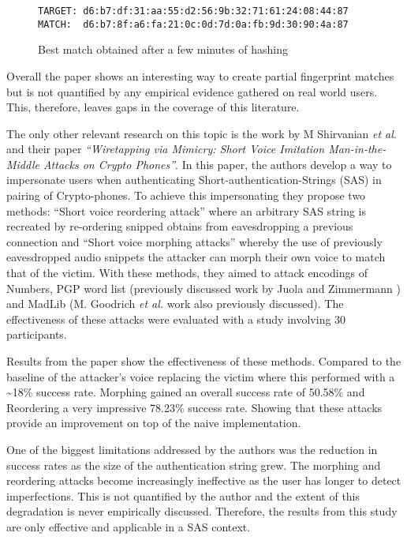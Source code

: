 \begin{figure}[!h]
    \begin{center}
        \verb|TARGET: d6:b7:df:31:aa:55:d2:56:9b:32:71:61:24:08:44:87|
        \verb|MATCH:  d6:b7:8f:a6:fa:21:0c:0d:7d:0a:fb:9d:30:90:4a:87|
    \end{center}
    \caption{Best match obtained after a few minutes of hashing}
    \label{ref:fuzz}
\end{figure}

Overall the paper shows an interesting way to create partial fingerprint matches but is not quantified by any empirical evidence gathered on real world users. This, therefore, leaves gaps in the coverage of this literature.

The only other relevant research on this topic is the work by M 
Shirvanian \textit{et al.}\cite{shirvanian2014wiretapping} 
and their paper \textit{``Wiretapping via Mimicry: Short 
Voice Imitation Man-in-the-Middle Attacks on Crypto 
Phones''}. In this paper, the authors develop a way to 
impersonate users when authenticating 
Short-authentication-Strings (SAS) in pairing of 
Crypto-phones. To achieve this impersonating they propose 
two methods: ``Short voice reordering attack'' where an 
arbitrary SAS string is recreated by re-ordering snipped 
obtains from eavesdropping a previous connection
and ``Short voice morphing attacks'' whereby the use of 
previously eavesdropped audio snippets the attacker can
morph their own voice to match that of the victim. With 
these methods, they aimed to attack encodings of Numbers, 
PGP word list (previously discussed work by Juola and 
Zimmermann \cite{juola1996whole}) and MadLib (M. Goodrich 
\textit{et al.}\cite{goodrich2006loud} work also 
previously discussed). The effectiveness of these attacks 
were evaluated with a study involving 30 participants.

Results from the paper show the effectiveness of these 
methods. Compared to the baseline of the attacker's voice 
replacing the victim where this performed with a 
\textasciitilde18\% success rate. Morphing gained an 
overall success rate of 50.58\% and Reordering a very 
impressive 78.23\% success rate. Showing that these 
attacks provide an improvement on top of the naive implementation.

One of the biggest limitations addressed by the authors 
was the reduction in success rates as the size of the 
authentication string grew. The morphing and reordering 
attacks become increasingly ineffective as the user has 
longer to detect imperfections. This is not quantified by 
the author and the extent of this degradation is never 
empirically discussed. Therefore, the results from this 
study are only effective and applicable in a SAS context.

